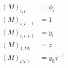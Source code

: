 \begin{equation}
 \begin{split}
  (M)_{i,i}   &= \phi_{i} \\
  (M)_{i,i-1} &= 1 \\
  (M)_{i,i+1} &= y_{i} \\
  (M)_{1,tN}  &= z \\
  (M)_{tN,1}  &= y_{0} z^{-1}
 \end{split}
\end{equation}

